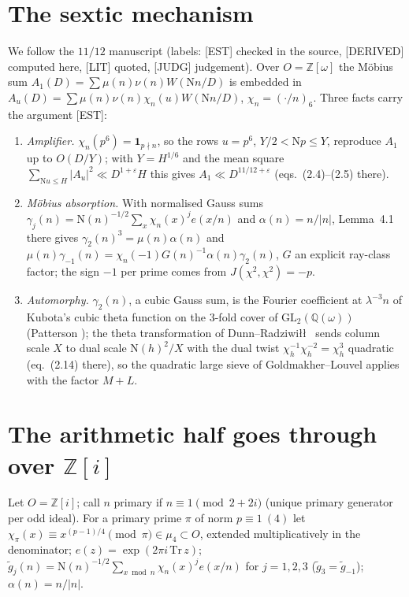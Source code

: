 \documentclass[11pt]{article}
\newcommand{\N}{\mathrm N}
\newcommand{\Z}{\mathbb Z}
\newcommand{\Q}{\mathbb Q}
\begin{document}
\section{The sextic mechanism}
We follow the $11/12$ manuscript \cite[\S2, \S4.1, App.~A.1]{Ope26b} (labels: [EST] checked in the source, [DERIVED] computed here, [LIT] quoted, [JUDG] judgement). Over $O=\Z[\omega]$ the M\"obius sum $A_1(D)=\sum\mu(n)\nu(n)W(\N n/D)$ is embedded in $A_u(D)=\sum\mu(n)\nu(n)\chi_n(u)W(\N n/D)$, $\chi_n=(\cdot/n)_6$. Three facts carry the argument [EST]:
\begin{enumerate}
\item \emph{Amplifier.} $\chi_n(p^6)=\mathbf 1_{p\nmid n}$, so the rows $u=p^6$, $Y/2<\N p\le Y$, reproduce $A_1$ up to $O(D/Y)$; with $Y=H^{1/6}$ and the mean square $\sum_{\N u\le H}|A_u|^2\ll D^{1+\varepsilon}H$ this gives $A_1\ll D^{11/12+\varepsilon}$ (eqs.\ (2.4)--(2.5) there).
\item \emph{M\"obius absorption.} With normalised Gauss sums $\gamma_j(n)=\N(n)^{-1/2}\sum_x\chi_n(x)^je(x/n)$ and $\alpha(n)=n/|n|$, Lemma~4.1 there gives $\gamma_2(n)^3=\mu(n)\alpha(n)$ and $\mu(n)\gamma_{-1}(n)=\chi_n(-1)G(n)^{-1}\alpha(n)\gamma_2(n)$, $G$ an explicit ray-class factor; the sign $-1$ per prime comes from $J(\chi^2,\chi^2)=-p$.
\item \emph{Automorphy.} $\gamma_2(n)$, a cubic Gauss sum, is the Fourier coefficient at $\lambda^{-3}n$ of Kubota's cubic theta function on the $3$-fold cover of $\mathrm{GL}_2(\Q(\omega))$ (Patterson \cite{Pat77}); the theta transformation of Dunn--Radziwi\l\l\ \cite{DR24} sends column scale $X$ to dual scale $\N(h)^2/X$ with the dual twist $\chi_h^{-1}\chi_h^{-2}=\chi_h^3$ quadratic (eq.\ (2.14) there), so the quadratic large sieve of Goldmakher--Louvel applies with the factor $M+L$.
\end{enumerate}

\section{The arithmetic half goes through over $\Z[i]$}
Let $O=\Z[i]$; call $n$ primary if $n\equiv1\pmod{2+2i}$ (unique primary generator per odd ideal). For a primary prime $\pi$ of norm $p\equiv1\ (4)$ let $\chi_\pi(x)\equiv x^{(p-1)/4}\pmod\pi\in\mu_4\subset O$, extended multiplicatively in the denominator; $e(z)=\exp(2\pi i\,\mathrm{Tr}\,z)$; $\tilde g_j(n)=\N(n)^{-1/2}\sum_{x\bmod n}\chi_n(x)^je(x/n)$ for $j=1,2,3$ ($\tilde g_3=\tilde g_{-1}$); $\alpha(n)=n/|n|$.
\end{document}
